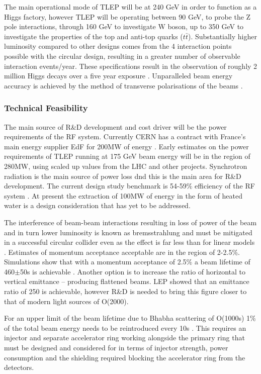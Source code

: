 The main operational mode of TLEP will be at 240 GeV in order to function as a Higgs factory, however TLEP will be operating between 90 GeV, to probe the Z pole interactions, through 160 GeV to investigate W boson, up to 350 GeV to investigate the properties of the top and anti-top quarks ($t\bar{t}$). Substantially higher luminosity compared to other designs comes from the 4 interaction points possible with the circular design, resulting in a greater number of observable interaction events/year. These specifications result in the observation of roughly 2 million Higgs decays over a five year exposure \cite{TLEP:CERNReport}. Unparalleled beam energy accuracy is achieved by the method of transverse polarisations of the beams \cite{TLEP:Review}.

\subsubsection{Technical Feasibility}

The main source of R\&D development and cost driver will be the power requirements of the RF system. Currently CERN has a contract with France’s main energy supplier EdF for 200MW of energy \cite{TLEP:Luminosity}. Early estimates on the power requirements of TLEP running at 175 GeV beam energy will be in the region of 280MW, using scaled up values from the LHC and other projects. Synchrotron radiation is the main source of power loss dnd this is the main area for R\&D development. The current design study benchmark is 54-59\% efficiency of the RF system \cite{TLEP:Review}. At present the extraction of 100MW of energy in the form of heated water is a design consideration that has yet to be addressed.

The interference of beam-beam interactions resulting in loss of power of the beam and in turn lower luminosity is known as bremsstrahlung and must be mitigated in a successful circular collider even as the effect is far less than for linear models \cite{TLEP:Luminosity}. Estimates of momentum acceptance acceptable are in the region of 2-2.5\%. Simulations show that with a momentum acceptance of 2.5\% a beam lifetime of 460$\pm$50s is achievable \cite{TLEP:EnergyRestriction}. Another option is to increase the ratio of horizontal to vertical emittance – producing flattened beams. LEP showed that an emittance ratio of 250 is achievable, however R\&D is needed to bring this figure closer to that of modern light sources of O(2000).

For an upper limit of the beam lifetime due to Bhabha scattering of O(1000s) 1\% of the total beam energy needs to be reintroduced every 10s \cite{TLEP:Janot} \cite{TLEP:CERNOverview}. This requires an injector and separate accelerator ring working alongside the primary ring that must be designed and considered for in terms of injector strength, power consumption and the shielding required blocking the accelerator ring from the detectors. 

